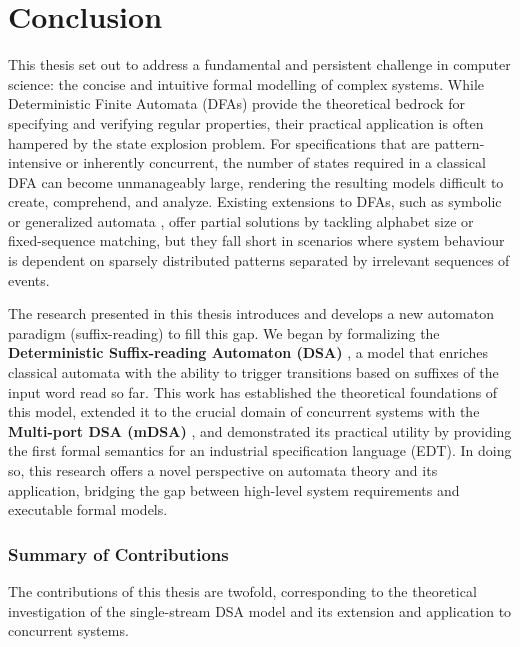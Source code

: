 
\chapter{Conclusion}

This thesis set out to address a fundamental and persistent challenge in computer science: the concise and intuitive formal modelling of complex systems. While Deterministic Finite Automata (DFAs) provide the theoretical bedrock for specifying and verifying regular properties, their practical application is often hampered by the state explosion problem. For specifications that are pattern-intensive or inherently concurrent, the number of states required in a classical DFA can become unmanageably large, rendering the resulting models difficult to create, comprehend, and analyze. Existing extensions to DFAs, such as symbolic or generalized automata \cite{DBLP:conf/popl/VeanesHLMB12, giammarresi1999deterministic}, offer partial solutions by tackling alphabet size or fixed-sequence matching, but they fall short in scenarios where system behaviour is dependent on sparsely distributed patterns separated by irrelevant sequences of events. %

The research presented in this thesis introduces and develops a new automaton paradigm (suffix-reading) to fill this gap. We began by formalizing the \textbf{Deterministic Suffix-reading Automaton (DSA)} \cite{Keerthan2024journal}, a model that enriches classical automata with the ability to trigger transitions based on suffixes of the input word read so far. This work has established the theoretical foundations of this model, extended it to the crucial domain of concurrent systems with the \textbf{Multi-port DSA (mDSA)} \cite{Keerthan2025netys}, and demonstrated its practical utility by providing the first formal semantics for an industrial specification language (EDT). In doing so, this research offers a novel perspective on automata theory and its application, bridging the gap between high-level system requirements and executable formal models.

\subsection*{Summary of Contributions}

The contributions of this thesis are twofold, corresponding to the theoretical investigation of the single-stream DSA model and its extension and application to concurrent systems.

